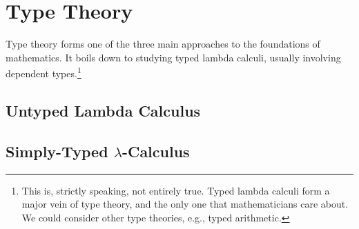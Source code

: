 \chapter{Type Theory}
\begin{node}\label{types-0000}%
Type theory forms one of the three main approaches to the foundations of
mathematics. It boils down to studying typed lambda calculi, usually
involving dependent types.\footnote{This is, strictly speaking, not
entirely true. Typed lambda calculi form a major vein of type theory,
and the only one that mathematicians care about. We could consider other
type theories, e.g., typed arithmetic.}
\end{node}

\section{Untyped Lambda Calculus}

\section{Simply-Typed $\lambda$-Calculus}
